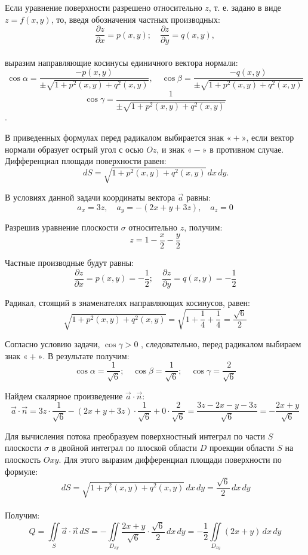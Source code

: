 \documentclass[12pt]{article}
\begin{document}
\begin{enumerate}[wide, labelwidth=!, labelindent=0pt]
		Если уравнение поверхности разрешено относительно $ z $, т. е. задано в виде $ z = f(x, y) $, то, введя обозначения частных производных:		
		$$ \frac{\partial z}{\partial x} = p(x,y);\quad \frac{\partial z}{\partial y} = q(x,y), $$\\
		выразим направляющие косинусы единичного вектора нормали: 
		$$ \cos{\alpha} = \frac{-p(x,y)}{\pm \sqrt{1+p^2(x,y)+q^2(x,y)}},\quad \cos{\beta} = \frac{-q(x,y)}{\pm \sqrt{1+p^2(x,y)+q^2(x,y)}}$$
		$$ \cos{\gamma} = \frac{1}{\pm \sqrt{1+p^2(x,y)+q^2(x,y)}}$$.
		
		В приведенных формулах перед радикалом выбирается знак $«+»$, если вектор нормали образует острый угол с осью $Oz$, и знак $«-»$ в противном случае. Дифференциал площади поверхности равен:
		$$\,d S = \sqrt{1+p^2(x,y)+q^2(x,y)}\,dx\,dy.$$
		
		В условиях данной задачи координаты вектора $ \vec{a} $ равны:
		$$a_x=3z,\quad a_y=- (2x+y+3z),\quad a_z =0$$
		
		Разрешив уравнение плоскости $ \sigma $ относительно $ z $, получим:
		$$z=1-\frac{x}{2}-\frac{y}{2}$$
		
		Частные производные будут равны:
		$$ \frac{\partial z}{\partial x} = p(x,y) = -\frac{1}{2};\quad \frac{\partial z}{\partial y} = q(x,y) = -\frac{1}{2} $$
		
		Радикал, стоящий в знаменателях направляющих косинусов, равен:
		$$  \sqrt{1+p^2(x,y)+q^2(x,y)} = \sqrt{1 +\frac{1}{4} + \frac{1}{4} } = \frac{\sqrt{6}}{2}$$
		
		Согласно условию задачи, $ \cos{\gamma} > 0 $ , следовательно, перед радикалом выбираем знак $ «+» $. В результате получим:
		$$\cos{\alpha} = \frac{1}{\sqrt{6}};\quad \cos{\beta} = \frac{1}{\sqrt{6}};\quad \cos{\gamma} = \frac{2}{\sqrt{6}}$$
		
		Найдем скалярное произведение $ \vec{a}\cdot \vec{n} $:
		$$\vec{a}\cdot \vec{n}=3z \cdot \frac{1}{\sqrt{6}} - (2x+y+3z) \cdot \frac{1}{\sqrt{6}} + 0\cdot \frac{2}{\sqrt{6}}=\frac{3z -2x-y-3z}{\sqrt{6}}=-\frac{2 x + y}{\sqrt{6}}$$
		
		Для вычисления потока преобразуем поверхностный интеграл по	части $ S $ плоскости $ \sigma $ в двойной интеграл по плоской области $ D $ проекции области $ S $ на плоскость $ Oxy $. Для этого выразим дифференциал площади поверхности по формуле:
		$$\,dS = \sqrt{1+p^2(x,y)+q^2(x,y)}\,dx\,dy =\frac{\sqrt{6}}{2}\,dx\,dy $$\\
		Получим:
		$$Q=\iint \limits_{S} \vec{a} \cdot \vec{n} \,d S = -\iint \limits_{D_{xy}}\frac{2 x + y}{\sqrt{6}} \cdot \frac{\sqrt{6}}{2}\,dx\,dy  = -\frac{1}{2} \iint \limits_{D_{xy}}(2 x + y)\,dx\,dy$$
		

\end{enumerate}
\end{document}
